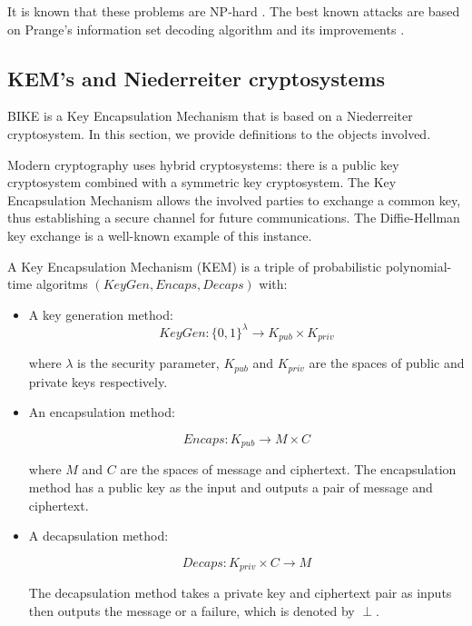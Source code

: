 It is known that these problems are NP-hard \cite{nphard}. The best known attacks are based on Prange's information set decoding algorithm and its improvements \cite{prange}.

\subsection{KEM's and Niederreiter cryptosystems}

BIKE is a Key Encapsulation Mechanism that is based on a Niederreiter cryptosystem. In this section, we provide definitions to the objects involved.

Modern cryptography uses hybrid cryptosystems: there is a public key cryptosystem combined with a symmetric key cryptosystem. The Key Encapsulation Mechanism allows the involved parties to exchange a common key, thus establishing a secure channel for future communications. The Diffie-Hellman key exchange is a well-known example of this instance.

\begin{defn}
A Key Encapsulation Mechanism (KEM) is a triple of probabilistic polynomial-time algoritms $(KeyGen, Encaps, Decaps)$ with:

\begin{itemize}
\item A key generation method:
\[
KeyGen: \{ 0,1 \}^\lambda \rightarrow K_{pub} \times K_{priv}
\]

where $\lambda$ is the security parameter, $K_{pub}$ and $K_{priv}$ are the spaces of public and private keys respectively.

\item An encapsulation method:

\[
Encaps: K_{pub} \rightarrow M \times C
\]

where $M$ and $C$ are the spaces of message and ciphertext. The encapsulation method has a public key as the input and outputs a pair of message and ciphertext.

\item A decapsulation method:

\[
Decaps: K_{priv} \times C \rightarrow M
\]

The decapsulation method takes a private key and ciphertext pair as inputs then outputs the message or a failure, which is denoted by $\perp$.
\end{itemize}
\end{defn}

